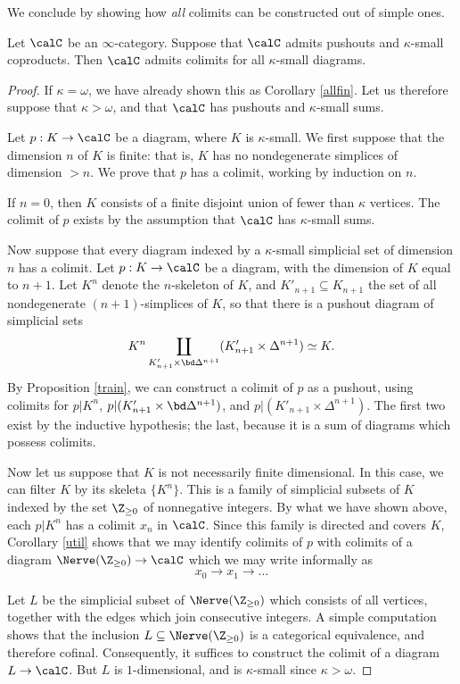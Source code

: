 We conclude by showing how {\em all} colimits can be constructed
out of simple ones.

\begin{proposition}\label{alllimits}
Let $\calC$ be an $\infty$-category. Suppose that $\calC$ admits pushouts and
$\kappa$-small coproducts. Then $\calC$ admits colimits for all $\kappa$-small diagrams.
\end{proposition}

\begin{proof}
If $\kappa = \omega$, we have already shown this as Corollary
\ref{allfin}. Let us therefore suppose that $\kappa > \omega$, and
that $\calC$ has pushouts and $\kappa$-small sums.

Let $p: K \rightarrow \calC$ be a diagram, where $K$ is
$\kappa$-small. We first suppose that the dimension $n$ of $K$ is
finite: that is, $K$ has no nondegenerate simplices of dimension
$> n$. We prove that $p$ has a colimit, working by induction on
$n$.

If $n=0$, then $K$ consists of a finite disjoint union of fewer
than $\kappa$ vertices. The colimit of $p$ exists by the
assumption that $\calC$ has $\kappa$-small sums.

Now suppose that every diagram indexed by a $\kappa$-small
simplicial set of dimension $n$ has a colimit. Let $p: K
\rightarrow \calC$ be a diagram, with the dimension of $K$ equal to
$n+1$. Let $K^n$ denote the $n$-skeleton of $K$, and $K'_{n+1} \subseteq K_{n+1}$ the
set of all nondegenerate $(n+1)$-simplices of $K$, so that there is a pushout
diagram of simplicial sets
$$ K^n \coprod_{ K'_{n+1} \times \bd \Delta^{n+1}} (K'_{n+1} \times
\Delta^{n+1}) \simeq K.$$ By Proposition \ref{train}, we can
construct a colimit of $p$ as a pushout, using colimits for
$p|K^n$, $p|(K'_{n+1} \times \bd \Delta^{n+1})$, and $p|(K'_{n+1}
\times \Delta^{n+1})$. The first two exist by the inductive
hypothesis; the last, because it is a sum of diagrams which
possess colimits.

Now let us suppose that $K$ is not necessarily finite dimensional.
In this case, we can filter $K$ by its skeleta $\{ K^n \}$. This
is a family of simplicial subsets of $K$ indexed by the set
$\Z_{\geq 0}$ of nonnegative integers. By what we have shown
above, each $p|K^n$ has a colimit $x_n$ in $\calC$. Since this family
is directed and covers $K$, Corollary \ref{util} shows that we may identify colimits of
$p$ with colimits of a diagram $\Nerve(\Z_{\geq 0}) \rightarrow \calC$ which we may write informally as
$$ x_0 \rightarrow x_1 \rightarrow \ldots $$

Let $L$ be the simplicial subset of
$\Nerve(\Z_{\geq 0})$ which consists of all vertices, together with the
edges which join consecutive integers. A simple computation shows
that the inclusion $L \subseteq \Nerve(\Z_{\geq 0})$ is a categorical
equivalence, and therefore cofinal. Consequently, it suffices to
construct the colimit of a diagram $L \rightarrow \calC$. But $L$ is
$1$-dimensional, and is $\kappa$-small since $\kappa > \omega$.
\end{proof}

